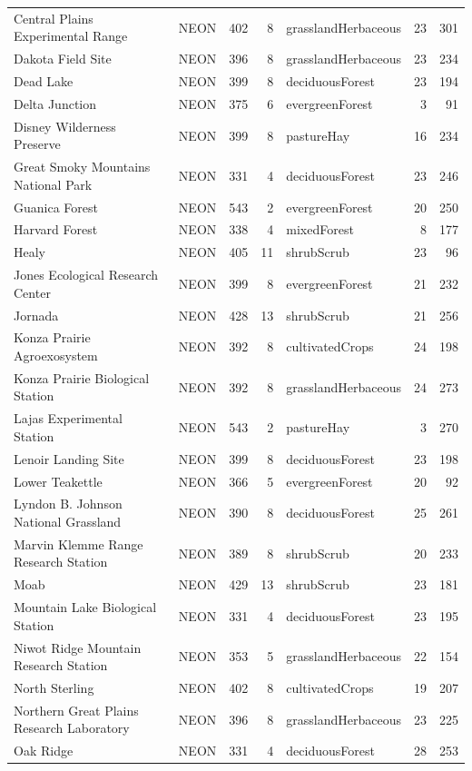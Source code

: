 \begin{tabular}{llrrlrr}
Central Plains Experimental Range & NEON & 402 & 8 & grasslandHerbaceous & 23 & 301 \\
Dakota Field Site & NEON & 396 & 8 & grasslandHerbaceous & 23 & 234 \\
Dead Lake & NEON & 399 & 8 & deciduousForest & 23 & 194 \\
Delta Junction & NEON & 375 & 6 & evergreenForest & 3 & 91 \\
Disney Wilderness Preserve & NEON & 399 & 8 & pastureHay & 16 & 234 \\
Great Smoky Mountains National Park & NEON & 331 & 4 & deciduousForest & 23 & 246 \\
Guanica Forest & NEON & 543 & 2 & evergreenForest & 20 & 250 \\
Harvard Forest & NEON & 338 & 4 & mixedForest & 8 & 177 \\
Healy & NEON & 405 & 11 & shrubScrub & 23 & 96 \\
Jones Ecological Research Center & NEON & 399 & 8 & evergreenForest & 21 & 232 \\
Jornada & NEON & 428 & 13 & shrubScrub & 21 & 256 \\
Konza Prairie Agroexosystem & NEON & 392 & 8 & cultivatedCrops & 24 & 198 \\
Konza Prairie Biological Station & NEON & 392 & 8 & grasslandHerbaceous & 24 & 273 \\
Lajas Experimental Station & NEON & 543 & 2 & pastureHay & 3 & 270 \\
Lenoir Landing Site & NEON & 399 & 8 & deciduousForest & 23 & 198 \\
Lower Teakettle & NEON & 366 & 5 & evergreenForest & 20 & 92 \\
Lyndon B. Johnson National Grassland & NEON & 390 & 8 & deciduousForest & 25 & 261 \\
Marvin Klemme Range Research Station & NEON & 389 & 8 & shrubScrub & 20 & 233 \\
Moab & NEON & 429 & 13 & shrubScrub & 23 & 181 \\
Mountain Lake Biological Station & NEON & 331 & 4 & deciduousForest & 23 & 195 \\
Niwot Ridge Mountain Research Station & NEON & 353 & 5 & grasslandHerbaceous & 22 & 154 \\
North Sterling & NEON & 402 & 8 & cultivatedCrops & 19 & 207 \\
Northern Great Plains Research Laboratory & NEON & 396 & 8 & grasslandHerbaceous & 23 & 225 \\
Oak Ridge & NEON & 331 & 4 & deciduousForest & 28 & 253 \\

\end{tabular}
